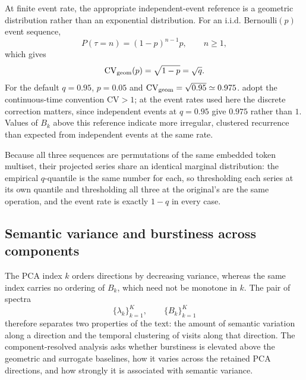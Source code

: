\documentclass[preprint]{elsarticle}
\newcommand{\CV}{\mathrm{CV}}
\begin{document}
At finite event rate, the appropriate independent-event reference is a
geometric distribution rather than an exponential distribution.
For an i.i.d. Bernoulli$(p)$ event sequence,
\begin{equation}
  P(\tau=n)=(1-p)^{n-1}p,
  \qquad n\geq1,
\end{equation}
which gives
\begin{equation}
   \CV_{\rm geom}(p)=\sqrt{1-p}=\sqrt{q}.
  \label{eq:cv_geometric}
\end{equation}
For the default $q=0.95$, $p=0.05$ and
$\CV_{\rm geom}=\sqrt{0.95}\simeq0.975$.
\citet{Altmann2012} adopt the continuous-time convention $\CV>1$; at
the event rates used here the discrete correction matters, since
independent events at $q=0.95$ give $0.975$ rather than $1$.
Values of $B_k$ above this reference indicate more irregular,
clustered recurrence than expected from independent events at the same
rate.


Because all three sequences are permutations of the same embedded token
multiset, their projected series share an identical marginal
distribution: the empirical $q$-quantile is the same number for each, so
thresholding each series at its own quantile and thresholding all three
at the original's are the same operation, and the event rate is exactly
$1-q$ in every case.
\subsection{Semantic variance and burstiness across components}
\label{sec:component_structure}

The PCA index $k$ orders directions by decreasing variance, 
whereas the same index carries no ordering of $B_k$, which need not be monotone in $k$.
The pair of spectra
\begin{equation}
  \{\lambda_k\}_{k=1}^K,
  \qquad
  \{B_k\}_{k=1}^K
  \label{eq:two_spectra}
\end{equation}
therefore separates two properties of the text: the amount of semantic
variation along a direction and the temporal clustering of visits along
that direction.
The component-resolved analysis asks whether burstiness is elevated
above the geometric and surrogate baselines, how it varies across the
retained PCA directions, and how strongly it is associated with
semantic variance.
\end{document}
